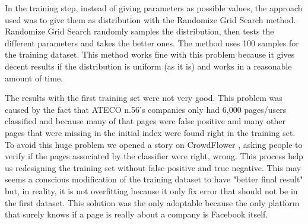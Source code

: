 In the training step, instead of giving parameters as possible values, the approach used was to give them as distribution with the Randomize Grid Search method. Randomize Grid Search randomly samples the distribution, then tests the different parameters and takes the better ones. The method uses 100 samples for the training dataset. This method works fine with this problem because it gives decent results if the distribution is uniform (as it is) and works in a reasonable amount of time.

The results with the first training set were not very good. This problem was caused by the fact that ATECO n.56's companies only had 6,000 pages/users classified and because many of that pages were false positive and many other pages that were missing in the initial index were found right in the training set.
To avoid this huge problem we opened a story on CrowdFlower
, asking people to verify if the pages associated by the classifier were right, wrong. This process help us redesigning the training set without false positive and true negative. This may seems a conscious modification of the training dataset to have "better final result" but, in reality, it is not overfitting because it only fix error that should not be in the first dataset. This solution was the only adoptable because the only platform that surely knows if a page is really about a company is Facebook itself.

